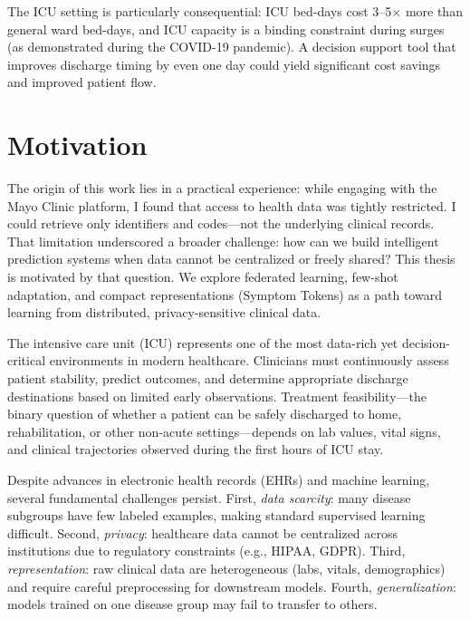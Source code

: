 The ICU setting is particularly consequential: ICU bed-days cost 3--5$\times$ more than general ward bed-days, and ICU capacity is a binding constraint during surges (as demonstrated during the COVID-19 pandemic). A decision support tool that improves discharge timing by even one day could yield significant cost savings and improved patient flow.

\section{Motivation}

The origin of this work lies in a practical experience: while engaging with the Mayo Clinic platform, I found that access to health data was tightly restricted. I could retrieve only identifiers and codes---not the underlying clinical records. That limitation underscored a broader challenge: how can we build intelligent prediction systems when data cannot be centralized or freely shared? This thesis is motivated by that question. We explore federated learning, few-shot adaptation, and compact representations (Symptom Tokens) as a path toward learning from distributed, privacy-sensitive clinical data.

The intensive care unit (ICU) represents one of the most data-rich yet decision-critical environments in modern healthcare. Clinicians must continuously assess patient stability, predict outcomes, and determine appropriate discharge destinations based on limited early observations. Treatment feasibility---the binary question of whether a patient can be safely discharged to home, rehabilitation, or other non-acute settings---depends on lab values, vital signs, and clinical trajectories observed during the first hours of ICU stay.

Despite advances in electronic health records (EHRs) and machine learning, several fundamental challenges persist. First, \emph{data scarcity}: many disease subgroups have few labeled examples, making standard supervised learning difficult. Second, \emph{privacy}: healthcare data cannot be centralized across institutions due to regulatory constraints (e.g., HIPAA, GDPR). Third, \emph{representation}: raw clinical data are heterogeneous (labs, vitals, demographics) and require careful preprocessing for downstream models. Fourth, \emph{generalization}: models trained on one disease group may fail to transfer to others.

